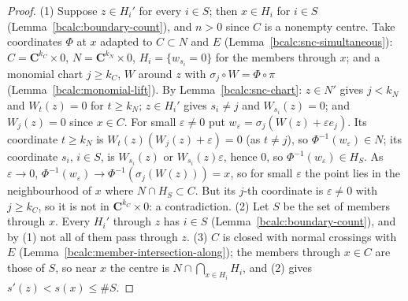 \begin{proof}
\mixedleanok
(1) Suppose \(z\in H_i'\) for every \(i\in S\); then \(x\in H_i\) for \(i\in S\) (Lemma~\ref{bcalc:boundary-count}), and \(n>0\) since \(C\) is a
nonempty centre. Take coordinates \(\Phi\) at \(x\) adapted to \(C\subset N\) and \(E\) (Lemma~\ref{bcalc:snc-simultaneous}): \(C=\mathbf C^{k_C}\times0\),
\(N=\mathbf C^{k_N}\times0\), \(H_i=\{w_{s_i}=0\}\) for the members through \(x\); and a monomial chart \(j\ge k_C\), \(W\) around \(z\) with
\(\sigma_j\circ W=\Phi\circ\pi\) (Lemma~\ref{bcalc:monomial-lift}). By Lemma~\ref{bcalc:snc-chart}: \(z\in N'\) gives \(j<k_N\) and \(W_t(z)=0\) for
\(t\ge k_N\); \(z\in H_i'\) gives \(s_i\ne j\) and \(W_{s_i}(z)=0\); and \(W_j(z)=0\) since \(x\in C\). For small \(\varepsilon\ne0\) put
\(w_\varepsilon=\sigma_j(W(z)+\varepsilon e_j)\). Its coordinate \(t\ge k_N\) is \(W_t(z)(W_j(z)+\varepsilon)=0\) (as \(t\ne j\)), so
\(\Phi^{-1}(w_\varepsilon)\in N\); its coordinate \(s_i\), \(i\in S\), is \(W_{s_i}(z)\) or \(W_{s_i}(z)\varepsilon\), hence \(0\), so
\(\Phi^{-1}(w_\varepsilon)\in H_S\). As \(\varepsilon\to0\), \(\Phi^{-1}(w_\varepsilon)\to\Phi^{-1}(\sigma_j(W(z)))=x\), so for small \(\varepsilon\) the point lies
in the neighbourhood of \(x\) where \(N\cap H_S\subset C\). But its \(j\)-th coordinate is \(\varepsilon\ne0\) with \(j\ge k_C\), so it is not in
\(\mathbf C^{k_C}\times0\): a contradiction.
(2) Let \(S\) be the set of members through \(x\). Every \(H_i'\) through \(z\) has \(i\in S\) (Lemma~\ref{bcalc:boundary-count}), and by (1) not all of them
pass through \(z\).
(3) \(C\) is closed with normal crossings with \(E\) (Lemma~\ref{bcalc:member-intersection-along}); the members through \(x\in C\) are those of \(S\), so
near \(x\) the centre is \(N\cap\bigcap_{x\in H_i}H_i\), and (2) gives \(s'(z)<s(x)\le\#S\).
\end{proof}

